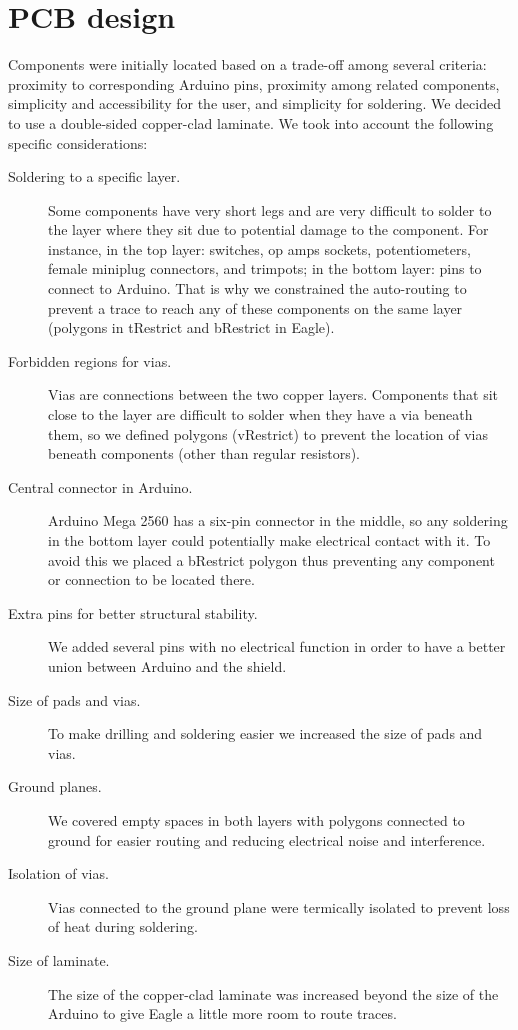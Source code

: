 \documentclass[twocolumn]{article}
\begin{document}
\section{PCB design}

Components were initially located based on a trade-off among several criteria: proximity to corresponding Arduino pins, proximity among related components, simplicity and accessibility for the user, and simplicity for soldering. We decided to use a double-sided copper-clad laminate. We took into account the following specific considerations:

\begin{description}
    \item[Soldering to a specific layer.] Some components have very short legs and are very difficult to solder to the layer where they sit due to potential damage to the component. For instance, in the top layer: switches, op amps sockets, potentiometers, female miniplug connectors, and trimpots; in the bottom layer: pins to connect to Arduino. That is why we constrained the auto-routing to prevent a trace to reach any of these components on the same layer (polygons in tRestrict and bRestrict in Eagle).
    
    \item[Forbidden regions for vias.] Vias are connections between the two copper layers. Components that sit close to the layer are difficult to solder when they have a via beneath them, so we defined polygons (vRestrict) to prevent the location of vias beneath components (other than regular resistors).
    
    \item[Central connector in Arduino.] Arduino Mega 2560 has a six-pin connector in the middle, so any soldering in the bottom layer could potentially make electrical contact with it. To avoid this we placed a bRestrict polygon thus preventing any component or connection to be located there.
    
    \item[Extra pins for better structural stability.] We added several pins with no electrical function in order to have a better union between Arduino and the shield.
    
    \item[Size of pads and vias.] To make drilling and soldering easier we increased the size of pads and vias.
    
    \item[Ground planes.] We covered empty spaces in both layers with polygons connected to ground for easier routing and reducing electrical noise and interference.
    
    \item[Isolation of vias.] Vias connected to the ground plane were termically isolated to prevent loss of heat during soldering.
    
    \item[Size of laminate.] The size of the copper-clad laminate was increased beyond the size of the Arduino to give Eagle a little more room to route traces.
\end{description}
\end{document}

